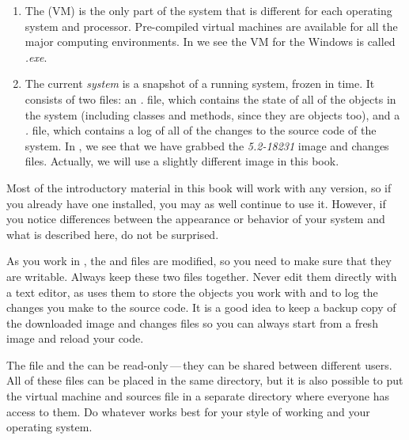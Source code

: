 \documentclass[a4paper,10pt,twoside]{book}
\begin{document}
\begin{enumerate}

  \item The  (VM) is the only part of the system that is different for each operating system and processor.  Pre-compiled virtual machines are available for all the major computing environments.  In  we see the VM for the Windows is called \textit{\sq.exe}.

  \item The current \emph{system } is a snapshot of a running \sq system, frozen in time.  It consists of two files: an \emph{.} file, which contains the state of all of the objects in the system (including classes and methods, since they are objects too), and a \emph{.} file, which contains a log of all of the changes to the source code of the system.
In , we see that we have grabbed the \textit{{\sq}5.2-18231} image and changes files.
Actually, we will use a slightly different image in this book.
\end{enumerate}

\label{sec:sbeImage}

Most of the introductory material in this book will work with any version, so if you already have one installed, you may as well continue to use it.
However, if you notice differences between the appearance or behavior of your system and what is described here, do not be surprised.

As you work in \sq, the  and  files are modified, so you need to make sure that they are writable.
Always keep these two files together.
Never edit them directly with a text editor, as \sq uses them to store the objects you work with and to log the changes you make to the source code.
It is a good idea to keep a backup copy of the downloaded image and changes files so you can always start from a fresh image and reload your code.

The  file and the  can be read-only\,---\,they can be shared between different users.
All of these files can be placed in the same directory, but it is also possible to put the virtual machine and sources file in a separate directory where everyone has access to them.
Do whatever works best for your style of working and your operating system.
\end{document}
